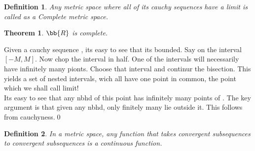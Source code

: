\documentclass{myclass}
\newtheorem*{definition}{Definition}
\newtheorem*{theorem}{Theorem}
\begin{document}
\begin{definition}
    Any metric space where all of its cauchy sequences have a limit is called as a Complete metric space.
\end{definition}

\begin{theorem}
    $\bb{R}$ is complete.
\end{theorem}
\begin{prf}
    Given a cauchy sequence , its easy to see that its bounded. Say on the interval $[-M,M]$.
    Now chop the interval in half. One of the intervals will necessarily have infinitely many pionts.
    Choose that interval and continur the bisection. This yields a set of nested intervals, wich all have one point in common,
    the point which we shall call limit!\\
    Its easy to see that any nbhd of this point has infinitely many points of . The key argument is that given any nbhd, only finitely many lie outside it.
    This follows from cauchyness.\qed
\end{prf}

\begin{definition}
    In a metric space, any function that takes convergent subsequences to convergent subsequences is a continuous function.
\end{definition}
\end{document}
